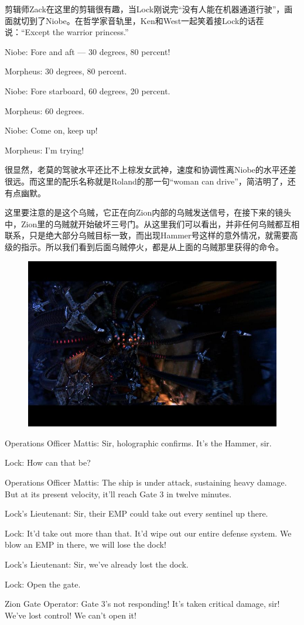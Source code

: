 \documentclass[UTF8]{ctexart}
\newenvironment{myquote}{\color{green} \setlength{\leftskip}{6em} \setlength{\rightskip}{4em} \setlength{\parindent}{-2em}}{\par}
\begin{document}
剪辑师Zack在这里的剪辑很有趣，当Lock刚说完“没有人能在机器通道行驶”，画面就切到了Niobe。在哲学家音轨里，Ken和West一起笑着接Lock的话茬说：“Except the warrior princess.”

\begin{myquote}
Niobe: Fore and aft --- 30 degrees, 80 percent!

Morpheus: 30 degrees, 80 percent.

Niobe: Fore starboard, 60 degrees, 20 percent.

Morpheus: 60 degrees.

Niobe: Come on, keep up!

Morpheus: I'm trying!
\end{myquote}

很显然，老莫的驾驶水平还比不上棕发女武神，速度和协调性离Niobe的水平还差很远。而这里的配乐名称就是Roland的那一句“woman can drive”，简洁明了，还有点幽默。

这里要注意的是这个乌贼，它正在向Zion内部的乌贼发送信号，在接下来的镜头中，Zion里的乌贼就开始破坏三号门。从这里我们可以看出，并非任何乌贼都互相联系，只是绝大部分乌贼目标一致，而出现Hammer号这样的意外情况，就需要高级的指示。所以我们看到后面乌贼停火，都是从上面的乌贼那里获得的命令。

\begin{figure}[htb]
\centering
\includegraphics[width=0.5\linewidth]{fig/e7e946103d6370fcc3ce79b0.jpg}
\end{figure}

\begin{myquote}
Operations Officer Mattis: Sir, holographic confirms. It's the Hammer, sir.

Lock: How can that be?

Operations Officer Mattis: The ship is under attack, sustaining heavy damage. But at its present velocity, it'll reach Gate 3 in twelve minutes.

Lock's Lieutenant: Sir, their EMP could take out every sentinel up there.

Lock: It'd take out more than that. It'd wipe out our entire defense system. We blow an EMP in there, we will lose the dock!

Lock's Lieutenant: Sir, we've already lost the dock.

Lock: Open the gate.

Zion Gate Operator: Gate 3's not responding! It's taken critical damage, sir! We've lost control! We can't open it!
\end{myquote}
\end{document}
